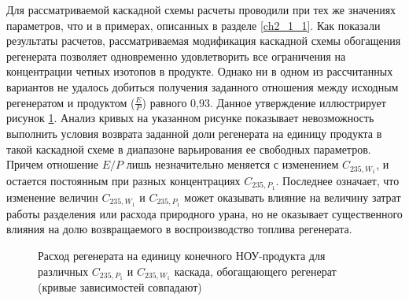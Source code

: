 Для рассматриваемой каскадной схемы расчеты проводили при тех же значениях параметров, что и в примерах, описанных в разделе \ref{ch2_1_1}. Как показали результаты расчетов, рассматриваемая модификация каскадной схемы обогащения регенерата позволяет одновременно удовлетворить все ограничения на концентрации четных изотопов в продукте. Однако ни в одном из рассчитанных вариантов не удалось добиться получения заданного отношения между исходным регенератом и продуктом ($\frac{E}{P}$) равного 0,93. Данное утверждение иллюстрирует рисунок \ref{Figure_10}. Анализ кривых на указанном рисунке показывает невозможность выполнить условия возврата заданной доли регенерата на единицу продукта в такой каскадной схеме в диапазоне варьирования ее свободных параметров. Причем отношение ${E}{/}{P}$ лишь незначительно меняется с изменением $C_{235, W_1}$, и остается постоянным при разных концентрациях $C_{235, P_1}$. Последнее означает, что изменение величин $C_{235, W_1}$ и $C_{235, P_1}$ может оказывать влияние на величину затрат работы разделения или расхода природного урана, но не оказывает существенного влияния на долю возвращаемого в воспроизводство топлива регенерата.

\begin{figure}[ht]
  \caption{Расход регенерата на единицу конечного НОУ-продукта для различных  $C_{235, P_1}$ и $C_{235, W_1}$ каскада, обогащающего регенерат (кривые зависимостей совпадают)}\label{Figure_10}
\end{figure}


